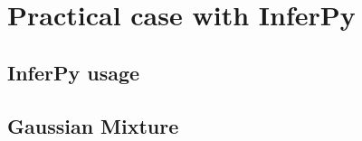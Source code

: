 \documentclass[twoside,openright,titlepage,numbers=noenddot,openany,headinclude,footinclude=true, cleardoublepage=empty,abstractoff,BCOR=5mm,paper=a4,fontsize=11pt, dvipsnames]{scrreprt}
\begin{document}


\ctparttext{
  \color{black}
  \begin{center}

  \end{center}
}
\part{Practical case with InferPy}

\chapter{InferPy usage}



\chapter{Gaussian Mixture}

\clearpage
\nocite{*}


\end{document}
